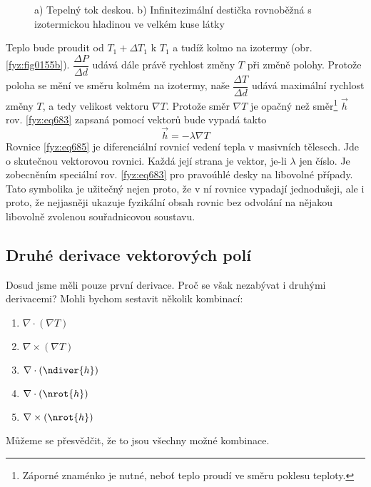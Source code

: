       \begin{figure}[ht!]
        \centering
        \caption{a) Tepelný tok deskou. b) Infinitezimální destička rovnoběžná s izotermickou 
                  hladinou ve velkém kuse látky \cite[s.~38]{Feynman02}}
        \label{fyz:fig0155}
      \end{figure}
  
      Teplo bude proudit od $T_1+\Delta T_1$ k $T_1$ a tudíž kolmo na izotermy (obr.
      \ref{fyz:fig0155b}). $\dfrac{\Delta P}{\Delta d}$ udává dále právě rychlost změny $T$ při změně
      polohy. Protože poloha se mění ve směru kolmém na izotermy, naše $\dfrac{\Delta T}{\Delta d}$
      udává maximální rychlost změny $T$, a tedy velikost vektoru $\nabla T$. Protože směr $\nabla T$
      je opačný než směr\footnote{Záporné znaménko je nutné, neboť teplo proudí ve směru poklesu
      teploty.} $\vec{h}$  rov. \ref{fyz:eq683} zapsaná pomocí vektorů bude vypadá takto
      \begin{equation}\label{fyz:eq685}
        \vec{h}=-\lambda\nabla T
      \end{equation}
      Rovnice \ref{fyz:eq685} je diferenciální rovnicí vedení tepla v masivních 
      tělesech. Jde o skutečnou vektorovou rovnici. Každá její strana je vektor, je-li $\lambda$ jen 
      číslo. Je zobecněním speciální rov. \ref{fyz:eq683} pro pravoúhlé desky na 
      libovolné případy. Tato symbolika je užitečný nejen proto, že v ní rovnice vypadají 
      jednodušeji, ale i proto, že nejjasněji ukazuje fyzikální obsah rovnic bez odvolání na nějakou 
      libovolně zvolenou souřadnicovou soustavu.      
      
    \subsection{Druhé derivace vektorových polí}\label{fyz:IIchapIIsecVII}
      Dosud jsme měli pouze první derivace. Proč se však nezabývat i druhými derivacemi? Mohli bychom
      sestavit několik kombinací:
      \begin{enumerate}[leftmargin=2cm,rightmargin=2cm, label=\emph{\alph*}),noitemsep]
        \setlength{\itemsep}{0cm}%
        \setlength{\parskip}{0em}%
        \item $\nabla\cdot(\nabla T)$
        \item $\nabla\times(\nabla T)$
        \item $\nabla\cdot(\ndiver{h})$
        \item $\nabla\cdot(\nrot{h})$
        \item $\nabla\times(\nrot{h})$
      \end{enumerate}
      Můžeme se přesvědčit, že to jsou všechny možné kombinace.
    
